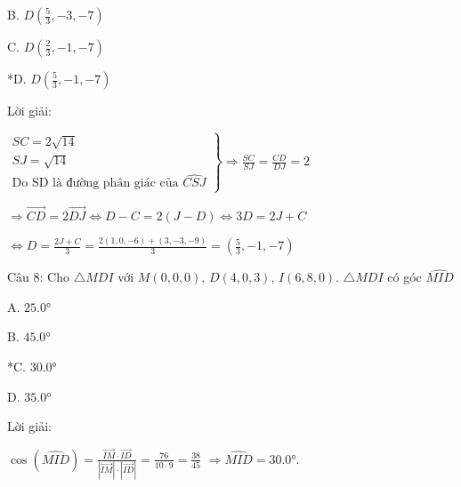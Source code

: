 \documentclass[a4paper,12pt]{article}
\begin{document}
B. \( D(\frac{5}{3}, -3, -7) \)

C. \( D(\frac{2}{3}, -1, -7) \)

*D. \( D(\frac{5}{3}, -1, -7) \)

Lời giải:

\(\left. \begin{array}{l}
SC = 2\sqrt{14} \\
SJ = \sqrt{14} \\
\text{Do SD là đường phân giác của } \widehat{CSJ}
\end{array} \right\} \Rightarrow \frac{SC}{SJ} = \frac{CD}{DJ} = 2\)

\(\Rightarrow \overrightarrow{CD} = 2\overrightarrow{DJ} \Leftrightarrow D - C = 2(J - D) \Leftrightarrow 3D = 2J + C\)

\(\Leftrightarrow D = \frac{2J + C}{3} = \frac{2(1, 0, -6) + (3, -3, -9)}{3} = (\frac{5}{3}, -1, -7)\)

Câu 8: Cho \( \triangle MDI \) với \( M(0, 0, 0) \), \( D(4, 0, 3) \), \( I(6, 8, 0) \). \( \triangle MDI \) có góc \( \widehat{MID} \)

A. \( 25.0° \)

B. \( 45.0° \)

*C. \( 30.0° \)

D. \( 35.0° \)

Lời giải:

\( \cos(\widehat{MID}) = \frac{\overrightarrow{IM} \cdot \overrightarrow{ID}}{|\overrightarrow{IM}| \cdot |\overrightarrow{ID}|} = \frac{76}{10 \cdot 9} = \frac{38}{45} \) \( \Rightarrow \widehat{MID} = 30.0° \).
\end{document}
